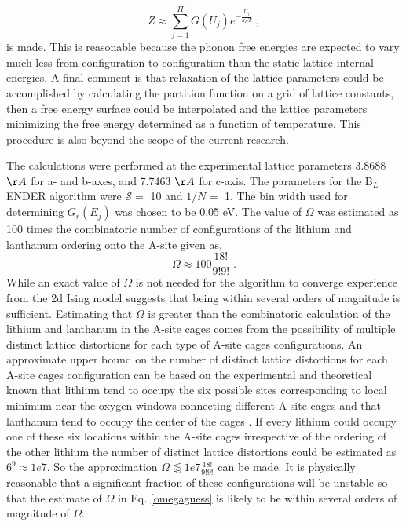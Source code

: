 \documentclass[aps,pre,reprint,superscriptaddress,showkeys]{revtex4-2}
\begin{document}
 \begin{equation}
 Z\approx \sum_{j=1}^{\Pi}G(U_j)e^{-\frac{U_j}{k_BT}}\;,
 \end{equation}
 is made. This is reasonable because the phonon free energies are expected to vary much less from configuration to configuration than the static lattice internal energies. A final comment is that relaxation of the lattice parameters could be accomplished by calculating the partition function on a grid of lattice constants, then a free energy surface could be interpolated and the lattice parameters minimizing the free energy determined as a function of temperature. This procedure is also beyond the scope of the current research. 
 
  The calculations were performed at the experimental lattice parameters 3.8688 $\AA$ for a- and b-axes, and 7.7463 $\AA$ for c-axis. The parameters for the B$_L$ENDER algorithm were $\mathcal{S}=$ 10 and $1/N=$ 1. The bin width used for determining $G_r(E_j)$ was chosen to be 0.05 eV. The value of $\Omega$ was estimated as 100 times the combinatoric number of configurations of the lithium and lanthanum ordering onto the A-site  given as, 
\begin{equation}
\Omega \approx 100\frac{18!}{9!9!} \;.
\label{omegaguess}
\end{equation}
While an exact value of $\Omega$ is not needed for the algorithm to converge experience from the 2d Ising model suggests that being within several orders of magnitude is sufficient. Estimating that $\Omega$ is greater than the combinatoric calculation of the lithium and lanthanum in the A-site cages comes from the possibility of multiple distinct lattice distortions for each type of A-site cages configurations. An approximate upper bound on the number of distinct lattice distortions for each A-site cages configuration can be based on the experimental and theoretical known that lithium tend to occupy the six possible sites corresponding to local minimum near the oxygen windows connecting different  A-site cages and that lanthanum tend to occupy the center of the cages \cite{Asitedistribution,imaginaryphonons,Li_La_ordering_computational,lithiumpos}. If every lithium could occupy one of these six locations within the A-site cages irrespective of the ordering of the other lithium the number of distinct lattice distortions could be estimated as $6^{9}\approx 1e7$. So the approximation $\Omega  \lessapprox 1e7  \frac{18!}{9!9!}$ can be made. It is physically reasonable that a significant fraction of these configurations will be unstable so that the estimate of $\Omega$ in Eq. \ref{omegaguess} is likely to be within several orders of magnitude of  $\Omega$. 
\end{document}
